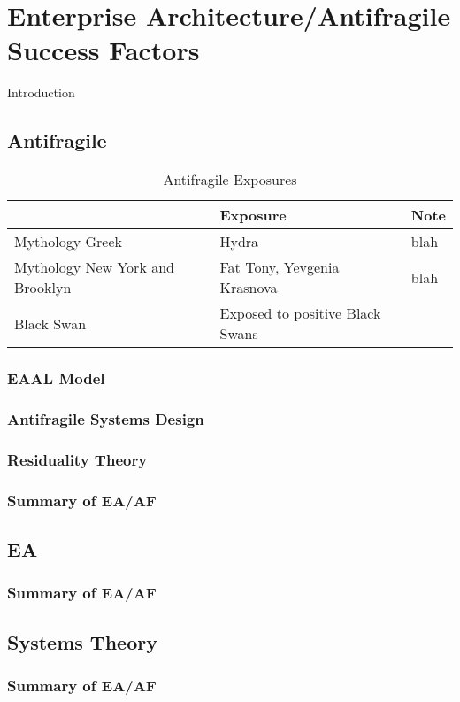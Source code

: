 \chapter{Enterprise Architecture/Antifragile Success Factors}
\label{chap:eaafsuccessfactors}

Introduction

\section{Antifragile}
\label{sec:sfantifragile}

\parencite[p. 23-27]{Taleb2012}
\begin{longtable}{p{}p{}p{}}
	& \textbf{Exposure} & \textbf{Note} \\ \midrule%
	\endhead%
	\hline
	\caption{Antifragile Exposures}
	\label{tab:sfantifragile types of exposure}	
	\endfoot%
	Mythology Greek & Hydra & blah \\
	Mythology New York and Brooklyn & Fat Tony, Yevgenia Krasnova & blah \\
	Black Swan & Exposed to positive Black Swans & \\
	
	\bottomrule
\end{longtable}

\subsection{EAAL Model}
\label{sub:eaal}

\subsection{Antifragile Systems Design}
\label{sub:sfasd}

\subsection{Residuality Theory}
\label{sub:sfresiduality}


\subsection{Summary of EA/AF}
\label{sub:sfsummaryantifragile}

\section{EA}
\label{sec:sfenterprisearchitecture}



\subsection{Summary of EA/AF}
\label{sub:sfsummaryenterprisearchitecture}

\section{Systems Theory}
\label{sec:sfsystemstheory}

\subsection{Summary of EA/AF}
\label{sub:sfsummarysystemstheory}
